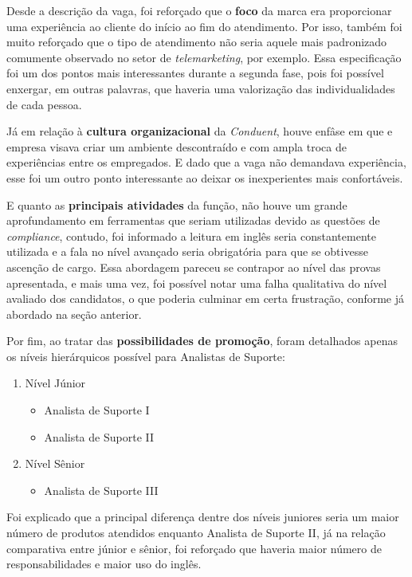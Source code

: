 \documentclass[12pt]{article}
\begin{document}
Desde a descrição da vaga, foi reforçado que o \textbf{foco} da marca era proporcionar uma experiência ao cliente do início ao fim do atendimento. Por isso, também foi muito reforçado que o tipo de atendimento não seria aquele mais padronizado comumente observado no setor de \emph {telemarketing}, por exemplo. Essa especificação foi um dos pontos mais interessantes durante a segunda fase, pois foi possível enxergar, em outras palavras, que haveria uma valorização das individualidades de cada pessoa. 

Já em relação à \textbf{cultura organizacional} da \emph{Conduent}, houve enfâse em que e empresa visava criar um ambiente descontraído e com ampla troca de experiências entre os empregados. E dado que a vaga não demandava experiência, esse foi um outro ponto interessante ao deixar os inexperientes mais confortáveis.

E quanto as \textbf{principais atividades} da função, não houve um grande aprofundamento em ferramentas que seriam utilizadas devido as questões de \emph{compliance}, contudo, foi informado a leitura em inglês seria constantemente utilizada e a fala no nível avançado seria obrigatória para que se obtivesse ascenção de cargo. Essa abordagem pareceu se contrapor ao nível das provas apresentada, e mais uma vez, foi possível notar uma falha qualitativa do nível avaliado dos candidatos, o que poderia culminar em certa frustração, conforme já abordado na seção anterior. 

Por fim, ao tratar das \textbf{possibilidades de promoção}, foram detalhados apenas os níveis hierárquicos possível para Analistas de Suporte: 

\newpage

\begin{enumerate}
   \item Nível Júnior
   \begin{itemize}
     \item Analista de Suporte I
     \item  Analista de Suporte II
   \end{itemize}
   \item Nível Sênior
   \begin{itemize}
     \item Analista de Suporte III
     \end{itemize}
\end{enumerate}

Foi explicado que a principal diferença dentre dos níveis juniores seria um maior número de produtos atendidos enquanto Analista de Suporte II, já na relação comparativa entre júnior e sênior, foi reforçado que haveria maior número de responsabilidades e maior uso do inglês. 
\end{document}
